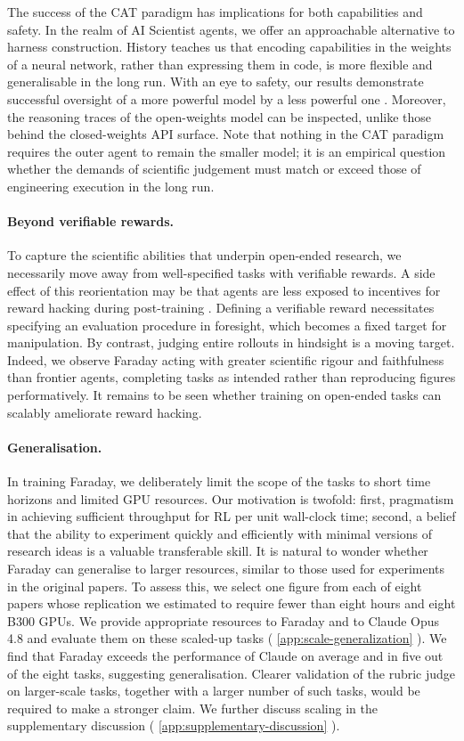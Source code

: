\documentclass[garamond,a4paper]{inherent}
\renewcommand{\sectionautorefname}{Section}%
\renewcommand{\subsectionautorefname}{Section}%
\renewcommand{\subsubsectionautorefname}{Section}%
\DeclareRobustCommand{\appref}[1]{%
  \begingroup
  \renewcommand{\sectionautorefname}{Appendix}%
  \renewcommand{\subsectionautorefname}{Appendix}%
  \renewcommand{\subsubsectionautorefname}{Appendix}%
  \autoref{#1}%
  \endgroup}
\begin{document}
The success of the CAT paradigm has implications for both capabilities and safety.
In the realm of AI Scientist agents, we offer an approachable alternative to harness construction.
History teaches us that encoding capabilities in the weights of a neural network, rather than expressing them in code, is more flexible and generalisable in the long run.
With an eye to safety, our results demonstrate successful oversight of a more powerful model by a less powerful one \citep{amodei2016concrete, bowman2022measuring, kenton2024scalable}.
Moreover, the reasoning traces of the open-weights model can be inspected, unlike those behind the closed-weights API surface.
Note that nothing in the CAT paradigm requires the outer agent to remain the smaller model; it is an empirical question whether the demands of scientific judgement must match or exceed those of engineering execution in the long run. 

\paragraph{Beyond verifiable rewards.} To capture the scientific abilities that underpin open-ended research, we necessarily move away from well-specified tasks with verifiable rewards. A side effect of this reorientation may be that agents are less exposed to incentives for reward hacking during post-training \citep{baker2025monitoring}. Defining a verifiable reward necessitates specifying an evaluation procedure in foresight, which becomes a fixed target for manipulation. By contrast, judging entire rollouts in hindsight is a moving target. Indeed, we observe Faraday acting with greater scientific rigour and faithfulness than frontier agents, completing tasks as intended rather than reproducing figures performatively. It remains to be seen whether training on open-ended tasks can scalably ameliorate reward hacking.

\paragraph{Generalisation.}
In training Faraday, we deliberately limit the scope of the tasks to short time horizons and limited GPU resources.
Our motivation is twofold: first, pragmatism in achieving sufficient throughput for RL per unit wall-clock time; second, a belief that the ability to experiment quickly and efficiently with minimal versions of research ideas is a valuable transferable skill.
It is natural to wonder whether Faraday can generalise to larger resources, similar to those used for experiments in the original papers.
To assess this, we select one figure from each of eight papers whose replication we estimated to require fewer than eight hours and eight B300 GPUs.
We provide appropriate resources to Faraday and to Claude Opus 4.8 and evaluate them on these scaled-up tasks (\appref{app:scale-generalization}).
We find that Faraday exceeds the performance of Claude on average and in five out of the eight tasks, suggesting generalisation. 
Clearer validation of the rubric judge on larger-scale tasks, together with a larger number of such tasks, would be required to make a stronger claim. We further discuss scaling in the supplementary discussion (\appref{app:supplementary-discussion}). 
\end{document}
